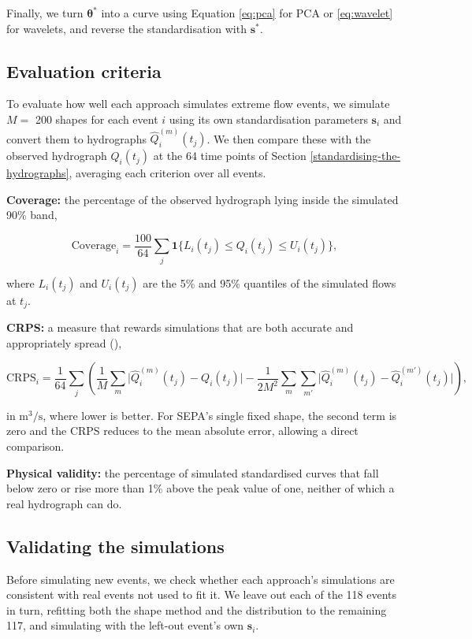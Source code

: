 \documentclass[
  11pt,
  a4paper]{article}
\begin{document}
Finally, we turn \(\boldsymbol{\theta}^\ast\) into a curve using Equation \eqref{eq:pca} for PCA or \eqref{eq:wavelet} for wavelets, and reverse the standardisation with \(\mathbf{s}^\ast\).

\subsection{Evaluation criteria}\label{uncertainty-criteria}

To evaluate how well each approach simulates extreme flow events, we simulate \(M =\) 200 shapes for each event \(i\) using its own standardisation parameters \(\mathbf{s}_i\) and convert them to hydrographs \(\hat{Q}_i^{(m)}(t_j)\). We then compare these with the observed hydrograph \(Q_i(t_j)\) at the 64 time points of Section \ref{standardising-the-hydrographs}, averaging each criterion over all events.

\textbf{Coverage:} the percentage of the observed hydrograph lying inside the simulated 90\% band,

\[
\text{Coverage}_i = \frac{100}{64}\sum_{j} \mathbf{1}\big\{L_i(t_j) \le Q_i(t_j) \le U_i(t_j)\big\},
\]

where \(L_i(t_j)\) and \(U_i(t_j)\) are the 5\% and 95\% quantiles of the simulated flows at \(t_j\).

\textbf{CRPS:} a measure that rewards simulations that are both accurate and appropriately spread (),

\[
\text{CRPS}_i = \frac{1}{64}\sum_{j}\left( \frac{1}{M}\sum_{m} \big|\hat{Q}_i^{(m)}(t_j) - Q_i(t_j)\big| - \frac{1}{2M^2}\sum_{m}\sum_{m'} \big|\hat{Q}_i^{(m)}(t_j) - \hat{Q}_i^{(m')}(t_j)\big| \right),
\]

in \(\text{m}^3/\text{s}\), where lower is better. For SEPA's single fixed shape, the second term is zero and the CRPS reduces to the mean absolute error, allowing a direct comparison.

\textbf{Physical validity:} the percentage of simulated standardised curves that fall below zero or rise more than 1\% above the peak value of one, neither of which a real hydrograph can do.

\subsection{Validating the simulations}\label{uncertainty-validating-sim}

Before simulating new events, we check whether each approach's simulations are consistent with real events not used to fit it. We leave out each of the 118 events in turn, refitting both the shape method and the distribution to the remaining 117, and simulating with the left-out event's own \(\mathbf{s}_i\).
\end{document}
